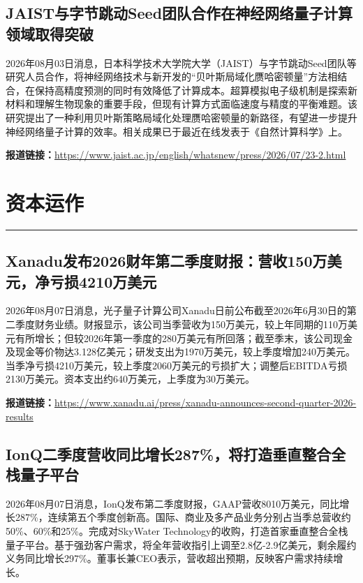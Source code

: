 \documentclass[12pt,a4paper]{ctexart}
\begin{document}
\subsection{ JAIST与字节跳动Seed团队合作在神经网络量子计算领域取得突破 }

2026年08月03日消息，日本科学技术大学院大学（JAIST）与字节跳动Seed团队等研究人员合作，将神经网络技术与新开发的“贝叶斯局域化赝哈密顿量”方法相结合，在保持高精度预测的同时有效降低了计算成本。超算模拟电子级机制是探索新材料和理解生物现象的重要手段，但现有计算方式面临速度与精度的平衡难题。该研究提出了一种利用贝叶斯策略局域化处理赝哈密顿量的新路径，有望进一步提升神经网络量子计算的效率。相关成果已于最近在线发表于《自然计算科学》上。

\noindent\textbf{报道链接：}\url{https://www.jaist.ac.jp/english/whatsnew/press/2026/07/23-2.html}


\newpage
\section{资本运作}
\vspace{-0.5em}
\noindent\rule{\linewidth}{1.5pt}

\subsection{ Xanadu发布2026财年第二季度财报：营收150万美元，净亏损4210万美元 }

2026年08月07日消息，光子量子计算公司Xanadu日前公布截至2026年6月30日的第二季度财务业绩。财报显示，该公司当季营收为150万美元，较上年同期的110万美元有所增长；但较2026年第一季度的280万美元有所回落；截至季末，该公司现金及现金等价物达3.128亿美元；研发支出为1970万美元，较上季度增加240万美元。当季净亏损4210万美元，较上季度2060万美元的亏损扩大；调整后EBITDA亏损2130万美元。资本支出约640万美元，上季度为30万美元。

\noindent\textbf{报道链接：}\url{https://www.xanadu.ai/press/xanadu-announces-second-quarter-2026-results}

\subsection{ IonQ二季度营收同比增长287\%，将打造垂直整合全栈量子平台 }

2026年08月07日消息，IonQ发布第二季度财报，GAAP营收8010万美元，同比增长287\%，连续第五个季度创新高。国际、商业及多产品业务分别占当季总营收约50\%、60\%和25\%。完成对SkyWater Technology的收购，打造首家垂直整合全栈量子平台。基于强劲客户需求，将全年营收指引上调至2.8亿-2.9亿美元，剩余履约义务同比增长297\%。董事长兼CEO表示，营收超出预期，反映客户需求持续增长。
\end{document}
